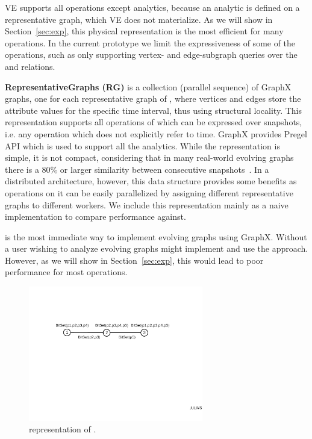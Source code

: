 VE supports all \tga operations except analytics, because an analytic
is defined on a representative graph, which VE does not materialize.
As we will show in Section~\ref{sec:exp}, this physical representation
is the most efficient for many operations.  In the current prototype
we limit the expressiveness of some of the operations, such as only
supporting vertex- and edge-subgraph queries over the \tav and \tae
relations.

{\bf RepresentativeGraphs (RG)} is a collection (parallel sequence) of
GraphX graphs, one for each representative graph of \ttt, where
vertices and edges store the attribute values for the specific time
interval, thus using structural locality.  This representation
supports all operations of \tga which can be expressed over snapshots,
i.e. any operation which does not explicitly refer to time.  GraphX
provides Pregel API which is used to support all the analytics.
%
While the \rg representation is simple, it is not compact, considering
that in many real-world evolving graphs there is a 80\% or larger
similarity between consecutive snapshots~\cite{Miao2015}.  In a
distributed architecture, however, this data structure provides some
benefits as operations on it can be easily parallelized by assigning
different representative graphs to different workers.  We include this
representation mainly as a naive implementation to compare performance
against.

\rg is the most immediate way to implement evolving graphs using
GraphX. Without \ql a user wishing to analyze evolving graphs might
implement and use the \rg approach.  However, as we will show in
Section~\ref{sec:exp}, this would lead to poor performance for most
operations.

\begin{figure}[t!]
\centering
\includegraphics[width=3in]{figs/ogc.pdf}
\vspace{-0.2cm}
\caption{\og representation of .}
\vspace{-0.1cm}
\label{fig:ogc}
\end{figure}

